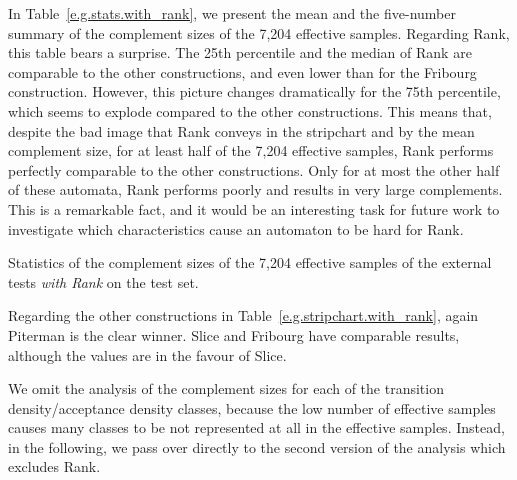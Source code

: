 In Table~\ref{e.g.stats.with_rank}, we present the mean and the five-number summary of the complement sizes of the 7,204 effective samples. Regarding Rank, this table bears a surprise. The 25th percentile and the median of Rank are comparable to the other constructions, and even lower than for the Fribourg construction. However, this picture changes dramatically for the 75th percentile, which seems to explode compared to the other constructions. This means that, despite the bad image that Rank conveys in the stripchart and by the mean complement size, for at least half of the 7,204 effective samples, Rank performs perfectly comparable to the other constructions. Only for at most the other half of these automata, Rank performs poorly and results in very large complements. This is a remarkable fact, and it would be an interesting task for future work to investigate which characteristics cause an automaton to be hard for Rank.

\begin{table}[htb]
\centering

\caption{Statistics of the complement sizes of the 7,204 effective samples of the external tests \textit{with Rank} on the \goal{} test set.}
\label{e.g.stats.with_rank}
\end{table}

Regarding the other constructions in Table~\ref{e.g.stripchart.with_rank}, again Piterman is the clear winner. Slice and Fribourg have comparable results, although the values are in the favour of Slice.

We omit the analysis of the complement sizes for each of the transition density/acceptance density classes, because the low number of effective samples causes many classes to be not represented at all in the effective samples. Instead, in the following, we pass over directly to the second version of the analysis which excludes Rank.


